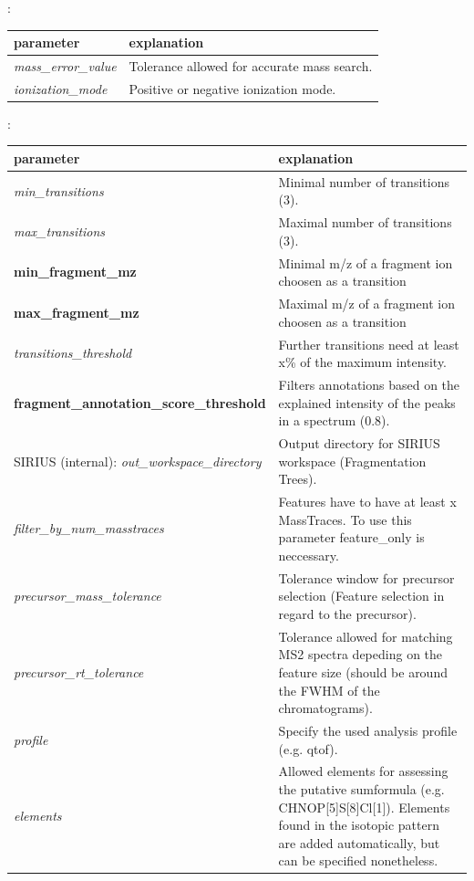 \noindent{}:
\begin{center}
\begin{tabular*}{\textwidth}{ p{5.5cm}|p{10.5cm} }
\textbf{parameter} & \textbf{explanation} \\ \hline
\textit{mass\_error\_value} & Tolerance allowed for accurate mass search. \\
\textit{ionization\_mode} &  Positive or negative ionization mode. \\
\end{tabular*}
\end{center}

\noindent{}:
\begin{center}
\begin{tabular*}{\textwidth}{ p{5.5cm}|p{10.5cm} }
\textbf{parameter} & \textbf{explanation} \\ \hline
\textit{min\_transitions} & Minimal number of transitions (3). \\
\textit{max\_transitions} &  Maximal number of transitions (3). \\
\textbf{min\_fragment\_mz} & Minimal m/z of a fragment ion choosen as a transition \\
\textbf{max\_fragment\_mz} & Maximal m/z of a fragment ion choosen as a transition \\
\textit{transitions\_threshold} & Further transitions need at least x\% of the maximum intensity. \\
\textbf{fragment\_annotation\_score\_threshold} & Filters annotations based on the explained intensity of the peaks in a spectrum (0.8). \\
SIRIUS (internal):
\textit{out\_workspace\_directory} & Output directory for SIRIUS workspace (Fragmentation Trees). \\
\textit{filter\_by\_num\_masstraces} &  Features have to have at least x MassTraces. To use this parameter feature\_only is neccessary. \\
\textit{precursor\_mass\_tolerance} & Tolerance window for precursor selection (Feature selection in regard to the precursor). \\
\textit{precursor\_rt\_tolerance} & Tolerance allowed for matching MS2 spectra depeding on the feature size (should be around the FWHM of the chromatograms). \\
\textit{profile} & Specify the used analysis profile (e.g. qtof). \\
\textit{elements} & Allowed elements for assessing the putative sumformula (e.g. CHNOP[5]S[8]Cl[1]). Elements found in the isotopic pattern are added automatically, but can be specified nonetheless. \\

\end{tabular*}
\end{center}
